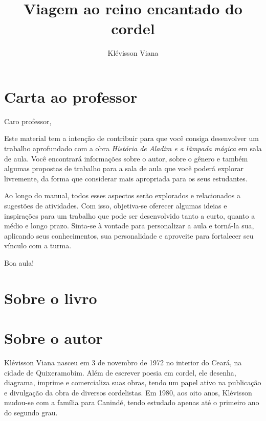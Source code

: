 \documentclass[11pt]{extarticle}
\newcommand{\AutorLivro}{Klévisson Viana}
\newcommand{\TituloLivro}{Viagem ao reino encantado do cordel}
\newcommand{\colaborador}{Paulo Pompermaier}
\begin{document}
\title{\TituloLivro}
\author{\AutorLivro}
\def\authornotes{\colaborador}

\date{}
\maketitle

\tableofcontents

\section{Carta ao professor}

Caro professor,

Este material tem a intenção de contribuir para que você consiga desenvolver um trabalho aprofundado com a obra \textit{História de Aladim e a lâmpada mágica} em sala de aula.
Você encontrará informações sobre o autor, sobre o gênero e também 
algumas propostas de trabalho para a sala de aula que você poderá explorar livremente, 
da forma que considerar mais apropriada para os seus estudantes.

Ao longo do manual, todos esses aspectos serão explorados e relacionados a sugestões de atividades. Com isso, objetiva-se oferecer algumas ideias e inspirações para um trabalho que pode ser desenvolvido tanto a curto, quanto a médio e longo prazo. Sinta-se à vontade para personalizar a aula e torná-la sua, aplicando seus conhecimentos, sua 
personalidade e aproveite para fortalecer seu vínculo com a turma.

Boa aula!

\section{Sobre o livro}



\reversemarginpar
\marginparwidth=5cm



\section{Sobre o autor}


Klévisson Viana nasceu em 3 de novembro de 1972 no interior do Ceará, na cidade de Quixeramobim. Além de escrever poesia em cordel, ele desenha, diagrama, imprime e comercializa suas obras, tendo um papel ativo na publicação e divulgação da obra de diversos cordelistas. Em 1980, aos oito anos, Klévisson mudou-se com a família para Canindé, tendo estudado apenas até o primeiro ano do segundo grau.
\end{document}
